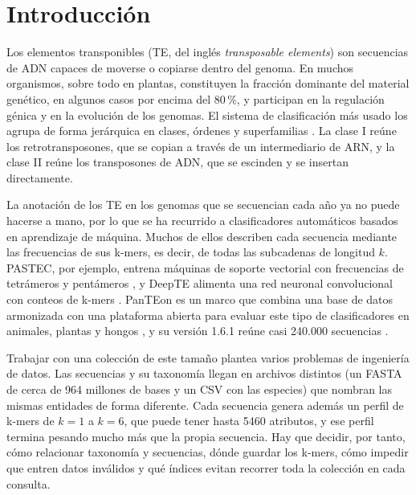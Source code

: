 \documentclass[pdflatex,lineno,referee,sn-vancouver-num]{sn-jnl}
\theoremstyle{thmstyleone}%
\theoremstyle{thmstyletwo}%
\theoremstyle{thmstylethree}%
\begin{document}
\section{Introducción}\label{sec:intro}

Los elementos transponibles (TE, del inglés \emph{transposable elements}) son secuencias de ADN capaces de moverse o copiarse dentro del genoma. En muchos organismos, sobre todo en plantas, constituyen la fracción dominante del material genético, en algunos casos por encima del 80\,\%, y participan en la regulación génica y en la evolución de los genomas. El sistema de clasificación más usado los agrupa de forma jerárquica en clases, órdenes y superfamilias \cite{wicker2007}. La clase I reúne los retrotransposones, que se copian a través de un intermediario de ARN, y la clase II reúne los transposones de ADN, que se escinden y se insertan directamente.

La anotación de los TE en los genomas que se secuencian cada año ya no puede hacerse a mano, por lo que se ha recurrido a clasificadores automáticos basados en aprendizaje de máquina. Muchos de ellos describen cada secuencia mediante las frecuencias de sus k-mers, es decir, de todas las subcadenas de longitud $k$. PASTEC, por ejemplo, entrena máquinas de soporte vectorial con frecuencias de tetrámeros y pentámeros \cite{hoede2014pastec}, y DeepTE alimenta una red neuronal convolucional con conteos de k-mers \cite{yan2020deepte}. PanTEon es un marco que combina una base de datos armonizada con una plataforma abierta para evaluar este tipo de clasificadores en animales, plantas y hongos \cite{orozco2026panteon}, y su versión 1.6.1 reúne casi 240.000 secuencias \cite{orozco2026panteondb}.

Trabajar con una colección de este tamaño plantea varios problemas de ingeniería de datos. Las secuencias y su taxonomía llegan en archivos distintos (un FASTA de cerca de 964 millones de bases y un CSV con las especies) que nombran las mismas entidades de forma diferente. Cada secuencia genera además un perfil de k-mers de $k=1$ a $k=6$, que puede tener hasta 5460 atributos, y ese perfil termina pesando mucho más que la propia secuencia. Hay que decidir, por tanto, cómo relacionar taxonomía y secuencias, dónde guardar los k-mers, cómo impedir que entren datos inválidos y qué índices evitan recorrer toda la colección en cada consulta.
\end{document}
